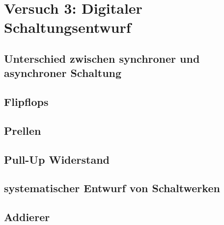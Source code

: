 \documentclass[paper=a4, fontsize=11pt]{scrartcl}
\numberwithin{equation}{section}
\numberwithin{figure}{section}
\numberwithin{table}{section}
\begin{document}

\newpage

\section{Versuch 3: Digitaler Schaltungsentwurf}


\subsection{Unterschied zwischen synchroner und asynchroner Schaltung}



\subsection{Flipflops}


\subsection{Prellen}


\subsection{Pull-Up Widerstand}


\subsection{systematischer Entwurf von Schaltwerken}


\subsection{Addierer}

\end{document}
